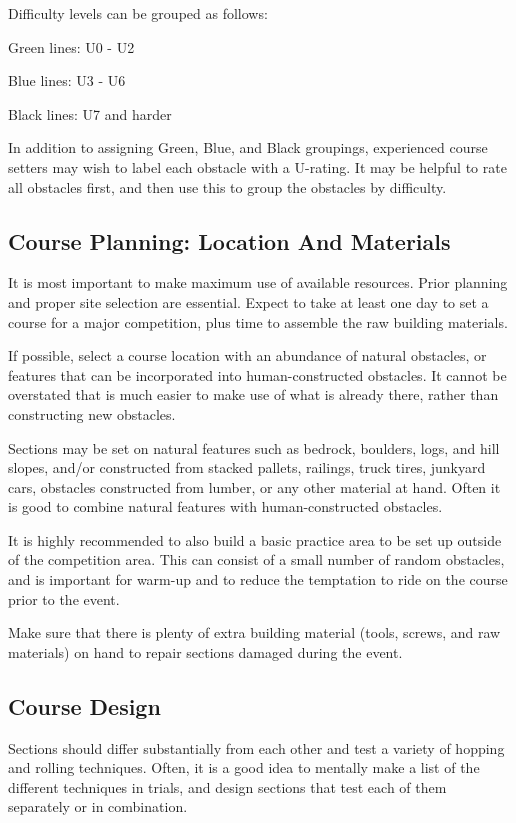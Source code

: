 Difficulty levels can be grouped as follows:

Green lines: U0 - U2

Blue lines: U3 - U6 

Black lines: U7 and harder

In addition to assigning Green, Blue, and Black groupings, experienced course setters may wish to label each obstacle with a U-rating.
It may be helpful to rate all obstacles first, and then use this to group the obstacles by difficulty.

\subsection{Course Planning: Location And Materials}
It is most important to make maximum use of available resources. 
Prior planning and proper site selection are essential.
Expect to take at least one day to set a course for a major competition, plus time to assemble the raw building materials.

If possible, select a course location with an abundance of natural obstacles, or features that can be incorporated into human-constructed obstacles. 
It cannot be overstated that is much easier to make use of what is already there, rather than constructing new obstacles.

Sections may be set on natural features such as bedrock, boulders, logs, and hill slopes, and/or constructed from stacked pallets, railings, truck tires, junkyard cars, obstacles constructed from lumber, or any other material at hand. 
Often it is good to combine natural features with human-constructed obstacles.

It is highly recommended to also build a basic practice area to be set up outside of the competition area. 
This can consist of a small number of random obstacles, and is important for warm-up and to reduce the temptation to ride on the course prior to the event.

Make sure that there is plenty of extra building material (tools, screws, and raw materials) on hand to repair sections damaged during the event.

\subsection{Course Design}
Sections should differ substantially from each other and test a variety of hopping and rolling techniques. 
Often, it is a good idea to mentally make a list of the different techniques in trials, and design sections that test each of them separately or in combination.

